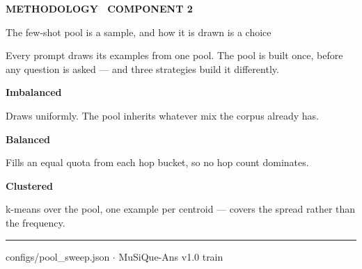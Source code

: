 \documentclass[aspectratio=169,11pt]{beamer}
\providecommand{\textls}[2][]{#2}
\newcommand{\lsp}[1]{\textls[140]{#1}}
\newcommand{\slidehead}[2]{%
  {\color{accent}\fontsize{6.8}{8}\selectfont\bfseries\lsp{#1}\par}%
  \vspace{2.4mm}%
  {\color{ink}\fontsize{15}{18}\selectfont #2\par}%
  \vspace{3.4mm}%
}
\newcommand{\thinrule}[1]{\noindent\textcolor{#1}{\rule{\linewidth}{0.4pt}}\par}
\newcommand{\srcmono}[1]{%
  \vfill\thinrule{rulec}\vspace{1.5mm}%
  {\color{muted}\ttfamily\fontsize{6.6}{8}\selectfont #1\par}}
\newcommand{\defrow}[3][30mm]{%
  \par\noindent\footnotesize
  \parbox[t]{#1}{\raggedright\bfseries\textcolor{ink}{#2}}%
  \parbox[t]{\dimexpr\linewidth-#1\relax}{\raggedright\textcolor{inktwo}{#3}}%
  \par\vspace{2.6mm}}
\begin{document}
\begin{frame}[t]
\slidehead{METHODOLOGY \textperiodcentered\ COMPONENT 2}{The few-shot pool is a sample, and how it is drawn is a choice}
{\color{inktwo}\small
 Every prompt draws its examples from one pool. The pool is built once, before any question
 is asked --- and three strategies build it differently.\par}
\vspace{5.5mm}
\defrow[30mm]{Imbalanced}{Draws uniformly. The pool inherits whatever mix the corpus already has.}
\defrow[30mm]{Balanced}{Fills an equal quota from each hop bucket, so no hop count dominates.}
\defrow[30mm]{Clustered}{k-means over the pool, one example per centroid --- covers the spread
 rather than the frequency.}
\vspace{4mm}
\srcmono{configs/pool\_sweep.json $\cdot$ MuSiQue-Ans v1.0 train}
\end{frame}
\end{document}
